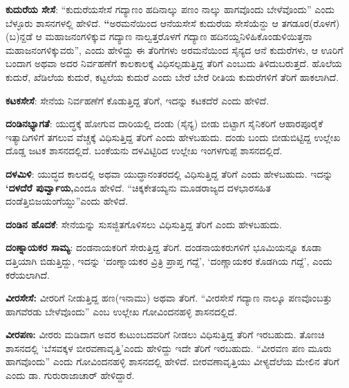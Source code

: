 \textbf{ಕುದುರೆಯ ಸೇಸೆ}: “ಕುದುರೆಯಸೇಸೆ ಗದ್ಯಾಣಂ ಹದಿನಾಲ್ಕು ಪಣಂ ನಾಲ್ಕು ಹಾಗವೊಂದು ಬೇಳೆವೊಂದು” ಎಂದು ಬೆಳ್ಳೂರು ಶಾಸನಗಳಲ್ಲಿ ಹೇಳಿದೆ. \textbf{“}ಅರಮನೆಯಿಂದ ಆನೆಯಸೇಸೆ ಕುದುರೆಯ ಸೇಸೆಯೆನ್ದು ಆ ತಗಡೂರ(ರೊಳಗೆ) (ಬ)ನ್ದಡೆ ಆ ಮಹಾಜನಂಗಳಿಕ್ಕುವ ಗದ್ಯಾಣ ನಾಲ್ವತ್ತರೊಳಗೆ ಗದ್ಯಾಣ ಹದಿನಯ್ದನಿಳಿಹಿಕೊಂಡುಳಿಯಿತ್ತನಾ ಮಹಾಜನಂಗಳಿಕ್ಕು\-ವರು”, ಎಂದು ಹೇಳಿದ್ದು ಈ ತೆರಿಗೆಗಳು ಅರಮನೆಯಿಂದ ಸೈನ್ಯದ ಆನೆ ಕುದುರೆಗಳು, ಆ ಊರಿಗೆ ಬಂದಾಗ ಅಥವಾ ಅದರ ನಿರ್ವಹಣೆಗೆ ಕಾಲಕಾಲಕ್ಕೆ ವಿಧಿಸಲ್ಪಡುತ್ತಿದ್ದ ತೆರಿಗೆ ಎಂಬುದು ತಿಳಿದುಬರುತ್ತದೆ. ಹೊಲೆಯ ಕುದುರೆ, ಖೆಡಿಲೆಯ ಕುದುರೆ, ಕಟ್ಟಲೆಯ ಕುದುರೆ ಎಂದು ಬೇರೆ ಬೇರೆ ರೀತಿಯ ಕುದುರೆಗಳಿಗೆ ತೆರಿಗೆ ಹಾಕಲಾಗಿದೆ.

\textbf{ಕಟಕಸೇಸೆ}: ಸೇನೆಯ ನಿರ್ವಹಣೆಗೆ ಕೊಡುತ್ತಿದ್ದ ತೆರಿಗೆ, ಇದನ್ನು ಕಟಕದೆರೆ ಎಂದು ಹೇಳಿದೆ.

\textbf{ದಂಡಿನಭ್ಯಾಗತೆ}: ಯುದ್ಧಕ್ಕೆ ಹೋಗುವ ದಾರಿಯಲ್ಲಿ ದಂಡು (ಸೈನ್ಯ) ಬೀಡು ಬಿಟ್ಟಾಗ ಸೈನಿಕರಿಗೆ ಆಹಾರಪೂರೈಕೆ ಇತ್ಯಾದಿಗಳಿಗೆ ತಗಲುವ ವೆಚ್ಚಕ್ಕೆ ವಿಧಿಸುತ್ತಿದ್ದ ತೆರಿಗೆ ಎಂದು ಹೇಳಬಹುದು. ದಂಡು ಬಂದು ಬೀಡುಬಿಟ್ಟಿದ್ದ ಉಲ್ಲೇಖ ದೊಡ್ಡ ಜಟಕ ಶಾಸನದಲ್ಲಿದೆ. ಬಂಕೆಯನು ದಳವಿಟ್ಟಿರಿದ ಉಲ್ಲೇಖ ಇಂಗಳಗುಪ್ಪೆ ಶಾಸನದಲ್ಲಿದೆ.

\textbf{ದಳಮಿಳಿ}: ಯುದ್ಧದ ಕಾಲದಲ್ಲಿ ಅಥವಾ ಯುದ್ಧಾನಂತರದಲ್ಲಿ ವಿಧಿಸುತ್ತಿದ್ದ ತೆರಿಗೆ ಎಂದು ಹೇಳಬಹುದು. ಇದನ್ನು \textbf{‘ದಳದೆರೆ ಪುರ್ವ್ವಾಯ,}ಎಂದೂ ಹೇಳಿದೆ. “ಚಿಕ್ಕಕೇತಯ್ಯನು ಮೂಡರಾಜ್ಯದ ದಳಭಾರಸಹಿತ ದಂಡೆತ್ತಿ\break ಬಿಜಯಂಗೆಯ್ದು”ಎಂದು ಹೇಳಿದೆ.

\textbf{ದಂಡಿನ ಹೊದಕೆ}: ಸೇನೆಯನ್ನು ಸುಸಜ್ಜಿತಗೊಳಿಸಲು ವಿಧಿಸುತ್ತಿದ್ದ ತೆರಿಗೆ ಎಂದು ಹೇಳಬಹುದು.

\textbf{ದಂಣ್ನಾಯಕರ ಸಾಮ್ಯ}: ದಂಡನಾಯಕರಿಗೆ ಸೇರುತ್ತಿದ್ದ ತೆರಿಗೆ. ದಂಡನಾಯಕರುಗಳಿಗೆ ಭೂಮಿಯನ್ನೂ ಕೂಡಾ ದತ್ತಿಯಾಗಿ ಬಿಡುತ್ತಿದ್ದು, ಇದನ್ನು ‘ದಂಣ್ನಾಯಕರ ವ್ರಿತ್ರಿ ಪ್ರಾಪ್ತ ಗದ್ದೆ’, ‘ದಂಣ್ಣಾಯಕರ ಕೊಡಗಿಯ ಗದ್ದೆ’, ಎಂದು ಕರೆಯಲಾಗಿದೆ.

\textbf{ವೀರಸೇಸೆ:} ವೀರರಿಗೆ ನೀಡುತ್ತಿದ್ದ ಹಣ(ಇನಾಮು) ಅಥವಾ ತೆರಿಗೆ. “ವೀರಸೇಸೆ ಗದ್ಯಾಣ ನಾಲ್ಕೂ ಪಣವೊಂಬತ್ತು ಹಾಗವೆರಡು ಬೇಳೆವೊಂದು” ಎಂಬ ಉಲ್ಲೇಖ ಗೋವಿಂದನಹಳ್ಳಿ ಶಾಸನದಲ್ಲಿದೆ.

\textbf{ವೀರಪಣ:} ವೀರರು ಮಡಿದಾಗ ಅವರ ಕುಟುಂಬದವರಿಗೆ ನೀಡಲು ವಿಧಿಸುತ್ತಿದ್ದ ತೆರಿಗೆ ಇರಬಹುದು. ತೊಣಚಿ ಶಾಸನದಲ್ಲಿ ‘ಬೆಸವಕ್ಕಳ ಬೀರವಣಾವೃತ್ತಿ’ಎಂದು ಹೇಳಿದ್ದು ಇದೇ ತೆರಿಗೆ ಇರಬಹುದು. “ವೀರವಣ ಪಣ ಮೂರು ಹಾಗವೊಂದು” ಎಂದು ಗೋವಿಂದನಹಳ್ಳಿ ಶಾಸನದಲ್ಲಿ ಹೇಳಿದೆ. ಬೀರವಣಾವೃತ್ತಿಯು ವೀಳ್ಯದೆಲೆಯ ಮೇಲಿನ ತೆರಿಗೆ ಎಂದು ಡಾ. ಗುರುರಾಜಾಚಾರ್​ ಹೇಳಿದ್ದಾರೆ.


